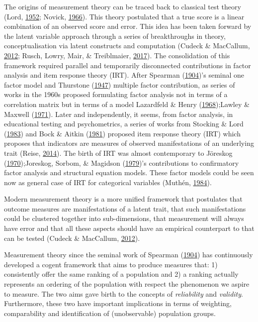 \documentclass[]{book}
\begin{document}
The origins of measurement theory can be traced back to classical test theory (Lord, \protect\hyperlink{ref-Lord1952}{1952}; Novick, \protect\hyperlink{ref-Novick1966}{1966}). This theory postulated that a true score is a linear combination of an observed score and error. This idea has been taken forward by the latent variable approach through a series of breakthroughs in theory, conceptualisation via latent constructs and computation (Cudeck \& MacCallum, \protect\hyperlink{ref-Cudeck2012}{2012}; Rusch, Lowry, Mair, \& Treiblmaier, \protect\hyperlink{ref-Rusch2017}{2017}). The consolidation of this framework required parallel and temporarily disconnected contributions in factor analysis and item response theory (IRT). After Spearman (\protect\hyperlink{ref-Spearman1904}{1904})'s seminal one factor model and Thurstone (\protect\hyperlink{ref-Thurstone1947}{1947}) multiple factor contribution, as series of works in the 1960s proposed formulating factor analysis not in terms of a correlation matrix but in terms of a model Lazardfeld \& Henry (\protect\hyperlink{ref-Lazardfeld1968}{1968});Lawley \& Maxwell (\protect\hyperlink{ref-Lawley1971}{1971}). Later and independently, it seems, from factor analysis, in educational testing and psychometrics, a series of works from Stocking \& Lord (\protect\hyperlink{ref-Stocking1983}{1983}) and Bock \& Aitkin (\protect\hyperlink{ref-Bock1981}{1981}) proposed item response theory (IRT) which proposes that indicators are measures of observed manifestations of an underlying trait (Reise, \protect\hyperlink{ref-Reise2014}{2014}). The birth of IRT was almost contemporary to Jöreskog (\protect\hyperlink{ref-Joereskog1970}{1970});Joreskog, Sorbom, \& Magidson (\protect\hyperlink{ref-Joreskog1979}{1979})'s contributions to confirmatory factor analysis and structural equation models. These factor models could be seen now as general case of IRT for categorical variables (Muthén, \protect\hyperlink{ref-Muthen1984}{1984}).

Modern measurement theory is a more unified framework that postulates that outcome measures are manifestations of a latent trait, that such manifestations could be clustered together into sub-dimensions, that measurement will always have error and that all these aspects should have an empirical counterpart to that can be tested (Cudeck \& MacCallum, \protect\hyperlink{ref-Cudeck2012}{2012}).

Measurement theory since the seminal work of Spearman (\protect\hyperlink{ref-Spearman1904}{1904}) has continuously developed a cogent framework that aims to produce measures that: 1) consistently offer the same ranking of a population and 2) a ranking actually represents an ordering of the population with respect the phenomenon we aspire to measure. The two aims gave birth to the concepts of \emph{reliability} and \emph{validity}. Furthermore, these two have important implications in terms of weighting, comparability and identification of (unobservable) population groups.
\end{document}
